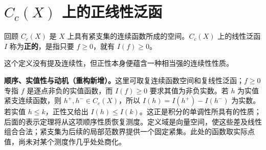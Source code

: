 \documentclass[../../main.tex]{subfiles}
\begin{document}
\section{$C_c(X)$ 上的正线性泛函}\label{section:ch07-positive-functionals}

\begin{definition}[正线性泛函]\label{definition:ch07-positive-functional}
回顾 $C_c(X)$ 是 $X$ 上具有紧支集的连续函数所成的空间。$C_c(X)$ 上的线性泛函 $I$ 称为\textbf{正的}，是指只要 $f\geqslant0$，就有 $I(f)\geqslant0$。
\end{definition}
这个定义没有提及连续性，但正性本身便蕴含一种相当强的连续性性质。
\begin{remark}
\textbf{顺序、实值性与动机（重构新增）。}这里可取复连续函数空间和复线性泛函；$f\geqslant0$ 专指 $f$ 是逐点非负的实值函数，而 $I(f)\geqslant0$ 要求其值为非负实数。若 $h$ 为实值紧支连续函数，则 $h^+,h^-\in C_c(X)$，所以 $I(h)=I(h^+)-I(h^-)$ 为实数。若实值 $h\leqslant k$，正性又给出 $I(h)\leqslant I(k)$。这正是积分的单调性所具有的性质；后面的表示定理将从这项顺序性质恢复测度。定义域是向量空间，使这些差及线性组合合法；紧支集为后续的局部范数界提供一个固定紧集。此处的函数取实际点值，尚未对某个测度作几乎处处商化。
\end{remark}
\end{document}
